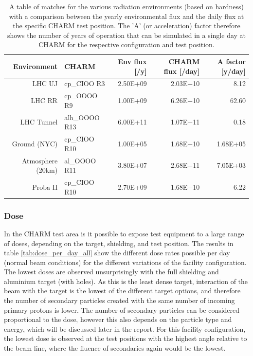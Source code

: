 \begin{table}[htbp]
  \centering
    \begin{tabular}{r|l|r|r|r}
    \textbf{Environment} & \textbf{CHARM} & \textbf{Env flux [/y]} & \textbf{CHARM flux [/day]} & \textbf{A factor [y/day]} \\
    \hline
    \hline
    LHC UJ & cp\_CIOO R3 & 2.50E+09 & 2.03E+10 & 8.12 \\
    LHC RR & cp\_OOOO R9 & 1.00E+09 & 6.26E+10 & 62.60 \\
    LHC Tunnel & alh\_OOOO R13 & 6.00E+11 & 1.07E+11 & 0.18 \\
    Ground (NYC) & cp\_CIOO R10 & 1.00E+05 & 1.68E+10 & 1.68E+05 \\
    Atmosphere (20km) & al\_OOOO R11 & 3.80E+07 & 2.68E+11 & 7.05E+03 \\
    Proba II & cp\_CIOO R10 & 2.70E+09 & 1.68E+10 & 6.22 \\
    \end{tabular}%
    \caption{A table of matches for the various radiation environments (based on hardness) with a comparison between the yearly environmental flux and the daily flux at the specific CHARM test position. The 'A' (or acceleration) factor therefore shows the number of years of operation that can be simulated in a single day at CHARM for the respective configuration and test position.}
  \label{tab:accl_factors_heh}%
\end{table}%


\subsubsection*{Dose}
In the CHARM test area is it possible to expose test equipment to a large range of doses, depending on the target, shielding, and test position. The results in table \ref{tab:dose_per_day_all} show the different dose rates possible per day (normal beam conditions) for the different variations of the facility configuration. \\

The lowest doses are observed unsurprisingly with the full shielding and aluminium target (with holes). As this is the least dense target, interaction of the beam with the target is the lowest of the different target options, and therefore the number of secondary particles created with the same number of incoming primary protons is lower. The number of secondary particles can be considered proportional to the dose, however this also depends on the particle type and energy, which will be discussed later in the report. For this facility configuration, the lowest dose is observed at the test positions with the highest angle relative to the beam line, where the fluence of secondaries again would be the lowest. \\

